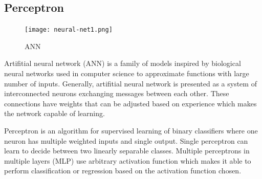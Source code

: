 \documentclass[12pt, oneside]{book}
\begin{document}
  \subsection{Perceptron}

    \begin{figure}
      \vspace*{-0.45cm}
      \centering
      \texttt{[image: neural-net1.png]}
      \vspace*{-1.45cm}
      \caption{ANN}
      \label{fig:network}
      \vspace*{-1.00cm}
    \end{figure}

    Artifitial neural network (ANN) is a family of models inspired by biological
    neural networks used in computer science to approximate functions with
    large number of inputs. Generally, artifitial neural network is presented
    as a system of interconnected neurons exchanging messages between each
    other. These connections have weights that can be adjusted based on
    experience which makes the network capable of learning.

    Perceptron is an algorithm for supervised learning of binary classifiers
    where one neuron has multiple weighted inputs and single output. Single
    perceptron can learn to decide between two linearly separable
    classes. Multiple perceptrons in multiple layers (MLP) use arbitrary
    activation function which makes it able to perform classification or
    regression based on the activation function chosen.

\renewcommand\bibname{References}


\end{document}

